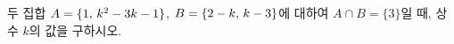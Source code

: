 두 집합 $A=\{1,\mkern3mu k^2-3k-1\}$, $B=\{2-k,\mkern3mu k-3\}$에 대하여 $A\cap B=\{3\}$일 때, 상수 $k$의 값을 구하시오.

